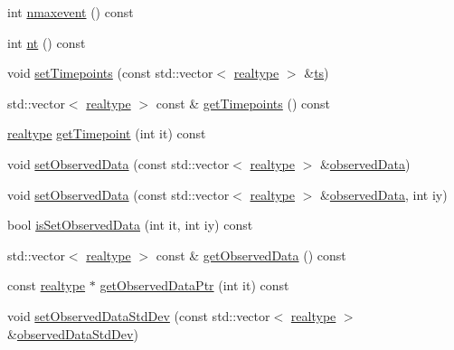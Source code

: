 \begin{DoxyCompactItemize}
\item 
int \mbox{\hyperlink{classamici_1_1_exp_data_ae6996d31ed94180a4b1d79412eb5ce31}{nmaxevent}} () const
\item 
int \mbox{\hyperlink{classamici_1_1_exp_data_a4c23d300cbe15b0afb1ee3731d47cc93}{nt}} () const
\item 
void \mbox{\hyperlink{classamici_1_1_exp_data_a058fb6c96339b5116b1af937bc77c2e4}{set\+Timepoints}} (const std\+::vector$<$ \mbox{\hyperlink{namespaceamici_a1bdce28051d6a53868f7ccbf5f2c14a3}{realtype}} $>$ \&\mbox{\hyperlink{classamici_1_1_exp_data_aa7014a80e7b102f85a10e3b9a480e8e5}{ts}})
\item 
std\+::vector$<$ \mbox{\hyperlink{namespaceamici_a1bdce28051d6a53868f7ccbf5f2c14a3}{realtype}} $>$ const  \& \mbox{\hyperlink{classamici_1_1_exp_data_a50ea5198d117f8f4ad1e34bb279975c8}{get\+Timepoints}} () const
\item 
\mbox{\hyperlink{namespaceamici_a1bdce28051d6a53868f7ccbf5f2c14a3}{realtype}} \mbox{\hyperlink{classamici_1_1_exp_data_abee92d90cb7fe75fa39fb98c2ab0fd0a}{get\+Timepoint}} (int it) const
\item 
void \mbox{\hyperlink{classamici_1_1_exp_data_a85ca23791c279fe94e5d9f8e528ca63e}{set\+Observed\+Data}} (const std\+::vector$<$ \mbox{\hyperlink{namespaceamici_a1bdce28051d6a53868f7ccbf5f2c14a3}{realtype}} $>$ \&\mbox{\hyperlink{classamici_1_1_exp_data_a6acedf749a3c5e4c4dcbc822f58a565d}{observed\+Data}})
\item 
void \mbox{\hyperlink{classamici_1_1_exp_data_a814827d61da6c675276758c856faf794}{set\+Observed\+Data}} (const std\+::vector$<$ \mbox{\hyperlink{namespaceamici_a1bdce28051d6a53868f7ccbf5f2c14a3}{realtype}} $>$ \&\mbox{\hyperlink{classamici_1_1_exp_data_a6acedf749a3c5e4c4dcbc822f58a565d}{observed\+Data}}, int iy)
\item 
bool \mbox{\hyperlink{classamici_1_1_exp_data_aedcda756b6356d6e147f2f4eb7658500}{is\+Set\+Observed\+Data}} (int it, int iy) const
\item 
std\+::vector$<$ \mbox{\hyperlink{namespaceamici_a1bdce28051d6a53868f7ccbf5f2c14a3}{realtype}} $>$ const  \& \mbox{\hyperlink{classamici_1_1_exp_data_a509b3b8f38e8529dd59c1415dc6b839c}{get\+Observed\+Data}} () const
\item 
const \mbox{\hyperlink{namespaceamici_a1bdce28051d6a53868f7ccbf5f2c14a3}{realtype}} $\ast$ \mbox{\hyperlink{classamici_1_1_exp_data_a8839910b831f8c55976d880df081fb3e}{get\+Observed\+Data\+Ptr}} (int it) const
\item 
void \mbox{\hyperlink{classamici_1_1_exp_data_a5d84a162eb705e032820acd004603f29}{set\+Observed\+Data\+Std\+Dev}} (const std\+::vector$<$ \mbox{\hyperlink{namespaceamici_a1bdce28051d6a53868f7ccbf5f2c14a3}{realtype}} $>$ \&\mbox{\hyperlink{classamici_1_1_exp_data_aa097568cebb4be48c4c1dfaab0c2a159}{observed\+Data\+Std\+Dev}})

\end{DoxyCompactItemize}
